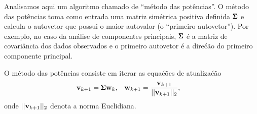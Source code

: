 

\label{ex:power-method}
Analisamos aqui um algoritmo chamado de ``m\'etodo das pot\^encias''. O m\'etodo das pot\^encias toma
como entrada uma matriz sim\'etrica positiva definida $\pmb{\Sigma}$ e calcula o
autovetor que possui o maior autovalor (o ``primeiro autovetor''). Por
exemplo, no caso da an\'alise de componentes principais, $\pmb{\Sigma}$ \'e a matriz de covari\^ancia dos dados observados e o primeiro autovetor \'e a dire\'c\~ao do primeiro componente principal.

O m\'etodo das pot\^encias consiste em iterar as equa\'c\~oes de atualiza\'c\~ao
\begin{align}
    \mathbf{v}_{k+1} &= \pmb{\Sigma} \mathbf{w}_{k}, & \mathbf{w}_{k+1} &= \frac{\mathbf{v}_{k+1}}{||\mathbf{v}_{k+1}||_2},
\end{align}
onde $||\mathbf{v}_{k+1}||_2$ denota a norma Euclidiana.

